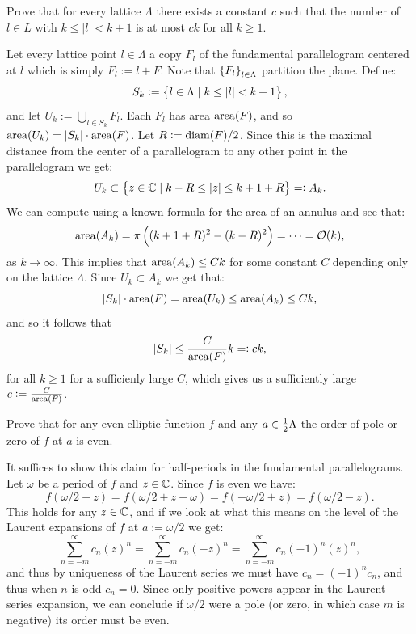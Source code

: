 \documentclass[11pt, a4paper]{article}
\begin{document}
\begin{exercise}
  Prove that for every lattice $\Lambda$ there exists a constant $c$ such
  that the number of $l \in L$ with $k \le |l| < k + 1$ is at most $c k$
  for all $k \geq 1$.
\end{exercise}
\begin{solution}
  Let every lattice point $l \in \Lambda$ a copy $F_l$
  of the fundamental parallelogram centered at $l$
  which is simply $F_l := l + F$.
  Note that $\left\{F_l\right\}_{l \in \Lambda}$ partition the plane.
  Define:
  \[
    S_k :=
    \left\{l \in \Lambda \mid k \le |l| < k + 1\right\},
  \]
  and let $U_k := \bigcup_{l \in S_k} F_l$.
  Each $F_{l}$ has area $\operatorname{area}(F)$,
  and so $\operatorname{area}(U_k) = |S_k| \cdot \operatorname{area}(F)$.
  Let $R := \operatorname{diam}(F)/2$.
  Since this is the maximal distance from the center of a parallelogram
  to any other point in the parallelogram we get:
  \[
    U_k \subset
    \left\{z \in \mathbb{C} \mid k - R \le |z| \le k + 1 + R\right\} =: A_k.
  \]
  We can compute using a known formula for the area of an annulus
  and see that:
  \[
    \area(A_k) = \pi\del{(k + 1 + R)^2 - (k - R)^2} = \cdots = \O(k),
  \]
  as $k \to \infty$.
  This implies that $\operatorname{area}(A_k) \le C k$ for some constant $C$ depending
  only on the lattice $\Lambda$.
  Since $U_k \subset A_k$ we get that:
  \[
    |S_k| \cdot \operatorname{area}(F) = \operatorname{area}(U_k) \le \operatorname{area}(A_k) \le C k,
  \]
  and so it follows that
  \[
    |S_k| \le \frac{C}{\operatorname{area}(F)} k =: ck,
  \]
  for all $k \geq 1$ for a sufficienly large $C$,
  which gives us a sufficiently large $c := \frac{C}{\operatorname{area}(F)}$.
\end{solution}

\begin{exercise}
  Prove that for any even elliptic function $f$ and any $a \in \frac{1}{2} \Lambda$
  the order of pole or zero of $f$ at $a$ is even.
\end{exercise}
\begin{solution}
  It suffices to show this claim for half-periods in the fundamental
  parallelograms.
  Let $\omega$ be a period of $f$ and $z \in \mathbb{C}$.
  Since $f$ is even we have:
  \[
    f(\omega/2 + z) =
    f(\omega/2 + z - \omega) =
    f(-\omega/2 + z) =
    f(\omega/2 - z).
  \]
  This holds for any $z \in \mathbb{C}$, and if we look at what this means
  on the level of the Laurent expansions of $f$ at $a := \omega/2$ we get:
  \[
    \sum_{n=-m}^{\infty} c_n (z)^n =
    \sum_{n=-m}^{\infty} c_n (-z)^n =
    \sum_{n=-m}^{\infty} c_n (-1)^{n}(z)^n,
  \]
  and thus by uniqueness of the Laurent series we must have $c_n = (-1)^{n} c_n$,
  and thus when $n$ is odd $c_n = 0$.
  Since only positive powers appear in the Laurent series expansion,
  we can conclude if $\omega/2$ were a pole (or zero, in which case $m$
  is negative) its order must be even.
\end{solution}
\end{document}
